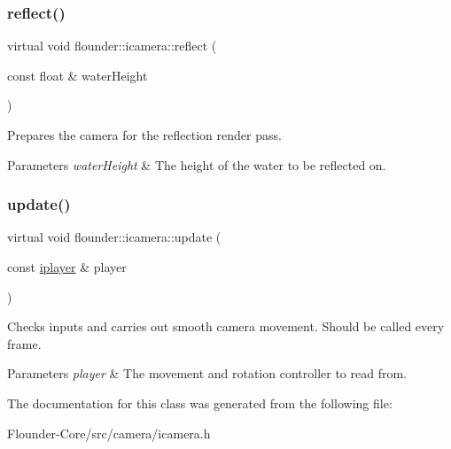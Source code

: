\subsubsection{\texorpdfstring{reflect()}{reflect()}}
{\footnotesize\ttfamily virtual void flounder\+::icamera\+::reflect (\begin{DoxyParamCaption}\item[{const float \&}]{water\+Height }\end{DoxyParamCaption})\hspace{0.3cm}{\ttfamily [pure virtual]}}



Prepares the camera for the reflection render pass. 


\begin{DoxyParams}{Parameters}
{\em water\+Height} & The height of the water to be reflected on. \\
\hline
\end{DoxyParams}
\mbox{\label{classflounder_1_1icamera_ac488c3db589fbba024d80d1f41dd7983}} 
\subsubsection{\texorpdfstring{update()}{update()}}
{\footnotesize\ttfamily virtual void flounder\+::icamera\+::update (\begin{DoxyParamCaption}\item[{const \hyperlink{classflounder_1_1iplayer}{iplayer} \&}]{player }\end{DoxyParamCaption})\hspace{0.3cm}{\ttfamily [pure virtual]}}



Checks inputs and carries out smooth camera movement. Should be called every frame. 


\begin{DoxyParams}{Parameters}
{\em player} & The movement and rotation controller to read from. \\
\hline
\end{DoxyParams}


The documentation for this class was generated from the following file\+:\begin{DoxyCompactItemize}
\item 
Flounder-\/\+Core/src/camera/icamera.\+h\end{DoxyCompactItemize}
